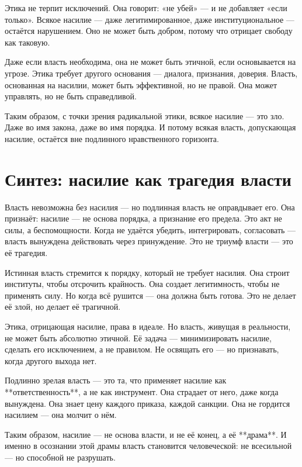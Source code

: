 Этика не терпит исключений. Она говорит: «не убей» — и не добавляет «если только». Всякое насилие — даже легитимированное, даже институциональное — остаётся нарушением. Оно не может быть добром, потому что отрицает свободу как таковую.

Даже если власть необходима, она не может быть этичной, если основывается на угрозе. Этика требует другого основания — диалога, признания, доверия. Власть, основанная на насилии, может быть эффективной, но не правой. Она может управлять, но не быть справедливой.

Таким образом, с точки зрения радикальной этики, всякое насилие — это зло. Даже во имя закона, даже во имя порядка. И потому всякая власть, допускающая насилие, остаётся вне подлинного нравственного горизонта.

\section{Синтез: насилие как трагедия власти}

Власть невозможна без насилия — но подлинная власть не оправдывает его. Она признаёт: насилие — не основа порядка, а признание его предела. Это акт не силы, а беспомощности. Когда не удаётся убедить, интегрировать, согласовать — власть вынуждена действовать через принуждение. Это не триумф власти — это её трагедия.

Истинная власть стремится к порядку, который не требует насилия. Она строит институты, чтобы отсрочить крайность. Она создает легитимность, чтобы не применять силу. Но когда всё рушится — она должна быть готова. Это не делает её злой, но делает её трагичной.

Этика, отрицающая насилие, права в идеале. Но власть, живущая в реальности, не может быть абсолютно этичной. Её задача — минимизировать насилие, сделать его исключением, а не правилом. Не освящать его — но признавать, когда другого выхода нет.

Подлинно зрелая власть — это та, что применяет насилие как **ответственность**, а не как инструмент. Она страдает от него, даже когда вынуждена. Она знает цену каждого приказа, каждой санкции. Она не гордится насилием — она молчит о нём.

Таким образом, насилие — не основа власти, и не её конец, а её **драма**. И именно в осознании этой драмы власть становится человеческой: не всесильной — но способной не разрушать.
